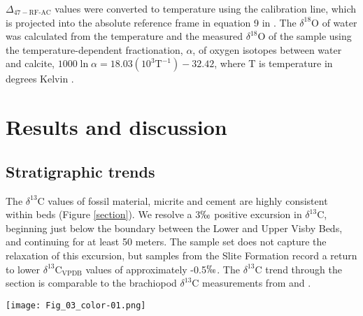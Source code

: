 \documentclass[5p, authoryear]{elsarticle}
\begin{document}
$\Delta_{47-\text{RF-AC}}$ values were converted to temperature using the \cite{Ghosh2006} calibration line, which is projected into the absolute reference frame in equation 9 in \cite{Dennis2011}. The $\delta^{18}$O of water was calculated from the temperature and the measured $\delta^{18}$O of the sample using the temperature-dependent fractionation, $\alpha$, of oxygen isotopes between water and calcite, $1000\ln\alpha=18.03(10^3\text{T}^{-1})-32.42$, where T is temperature in degrees Kelvin \citep{Kim1997}. 

\section{Results and discussion}

\subsection{Stratigraphic trends}

The $\delta^{13}$C values of fossil material, micrite and cement are highly consistent within beds (Figure \ref{section}). We resolve a 3$\permil$ positive excursion in $\delta^{13}$C, beginning just below the boundary between the Lower and Upper Visby Beds, and continuing for at least 50 meters. The sample set does not capture the relaxation of this excursion, but samples from the Slite Formation record a return to lower $\delta^{13}$C$_{\text{VPDB}}$ values of approximately -0.5$\permil$. The $\delta^{13}$C trend through the section is comparable to the brachiopod $\delta^{13}$C measurements from \cite{Bickert1997} and \cite{Munnecke2003}. 

\begin{figure*}[t]
\centering
\texttt{[image: Fig\_03\_color-01.png]}
\caption{The $\delta^{13}$C, $\delta^{18}$O and clumped isotope temperature of all the samples analyzed in this study, plotted against stratigraphic height. For the Lower \& Upper Visby and H\"{o}gklint Formations, a height of zero meters is defined by the contact between the Lower Visby Beds and the Upper Visby Beds. For the Slite Formation, a height of zero meters is defined as an arbitrary bed near the base of the outcrop. Brachiopod $\delta^{13}$C and $\delta^{18}$O measurements from \cite{Munnecke2003} are also included. Error bars represent the standard error of the mean.}
\label{section}
\end{figure*}
\end{document}
